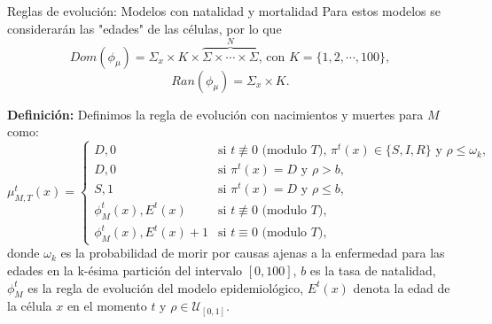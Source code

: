 \documentclass[9pt]{beamer}
\begin{document}
\begin{frame}{Reglas de evolución: Modelos con natalidad y mortalidad}
Para estos modelos se considerarán las "edades" de las células, por lo que
$$Dom(\phi_\mu)=\Sigma_x\times K\times\overbrace{\Sigma\times\cdots\times\Sigma}^N\text{, con }K=\{1,2,\cdots,100\},$$
$$Ran(\phi_\mu)=\Sigma_x\times K.$$

\textbf{Definición:} Definimos la regla de evolución con nacimientos y muertes para $M$ como:
\begin{equation*}
    \mu_{M,T}^t(x)=\left\{\begin{array}{ll}
        D,0 & \text{si }t\not\equiv 0 \text{ (modulo }T\text{), }\pi^t(x)\in\{S,I,R\}\text{ y }\rho\leq\omega_k, \\
        D,0 & \text{si }\pi^t(x)=D\text{ y }\rho>b,\\
        S,1 & \text{si }\pi^t(x)=D\text{ y }\rho\leq b,\\
        \phi_M^t(x),E^t(x) & \text{si }t\not\equiv 0 \text{ (modulo }T),\\
        \phi_M^t(x),E^t(x)+1 & \text{si }t\equiv 0 \text{ (modulo }T),
    \end{array}\right.
\end{equation*}
donde $\omega_k$ es la probabilidad de morir por causas ajenas a la enfermedad para las edades en la k-ésima partición del intervalo $[0,100]$, $b$ es la tasa de natalidad, $\phi_M^t$ es la regla de evolución del modelo epidemiológico, $E^t(x)$ denota la edad de la célula $x$ en el momento $t$ y $\rho\in\mathcal{U}_{[0,1]}$.
\end{frame}


\end{document}
